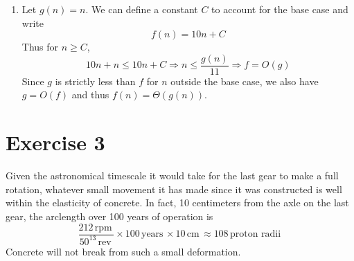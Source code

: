 \documentclass[12pt]{article}
\newcommand{\Unit}[1]{\,\text{#1} \,}
\begin{document}
\begin{enumerate}
\item{
Let $g(n) = n$. We can define a constant $C$ to account for the base case and write
$$
f(n) = 10n + C
$$
Thus for $n \geq C$,
$$
10n + n \leq 10n + C \Rightarrow n \leq \frac{g(n)}{11} \Rightarrow f = O(g)
$$
Since $g$ is strictly less than $f$ for $n$ outside the base case, we also have $g = O(f)$ and thus $f(n) = \Theta(g(n))$. 
}
\end{enumerate}

\section*{Exercise 3}

Given the astronomical timescale it would take for the last gear to make a full rotation, whatever small movement it has made since it was constructed is well within the elasticity of concrete. In fact, 10 centimeters from the axle on the last gear, the arclength over 100 years of operation is
$$
\frac{212 \Unit{rpm}}{50^{13} \Unit{rev}} \times 100 \Unit{years} \times 10 \Unit{cm} \approx 108 \Unit{proton radii} 
$$
Concrete will not break from such a small deformation.
\end{document}
